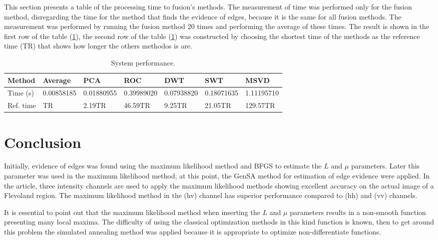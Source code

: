 \documentclass[journal]{IEEEtran}
\begin{document}
This section presents a table of the processing time to fusion's methods. The measurement of time was performed only for the fusion method, disregarding the time for the method that finds the evidence of edges, because it is the same for all fusion methods. The measurement was performed by running the fusion method 20 times and performing the average of these times. The result is shown in the first row of the table (\ref{metrica_de_tempo}), the second row of the table  (\ref{metrica_de_tempo}) was constructed by choosing the shortest time of the methods as the reference time (TR) that shows how longer the others methodos is are.
\begin{table}[hbt]
	\centering
	\tiny
	\caption{System performance.}\label{metrica_de_tempo}
\begin{tabular}{@{}lllllll@{}} \toprule
	Method       & Average    &   PCA      &  ROC      & DWT       &  SWT        &  MSVD \\ \midrule
	Time (s)      & 0.00858185 & 0.01880955 &0.39989020 &0.07938820 &  0.18071635 & 1.11195710  \\
    Ref. time     & TR & 2.19TR &46.59TR & 9.25TR   & 21.05TR & 129.57TR  \\ \bottomrule
\end{tabular}
\end{table}
\section{Conclusion}\label{sec_06}

Initially, evidence of edges was found using the maximum likelihood method and BFGS to estimate the $L$ and $\mu$ parameters. Later this parameter was used in the maximum likelihood method; at this point, the GenSA method for estimation of edge evidence were applied. In the article, three intensity channels are used to apply the maximum likelihood methods showing excellent accuracy on the actual image of a Flevoland region. The maximum likelihood method in the (hv) channel has superior performance compared to (hh) and (vv) channels.

It is essential to point out that the maximum likelihood method when inserting the $L$ and $\mu$ parameters results in a non-smooth function presenting many local maxima. The difficulty of using the classical optimization methods in this kind function is known, then to get around this problem the simulated annealing method was applied because it is appropriate to optimize non-differentiate functions.
\end{document}
